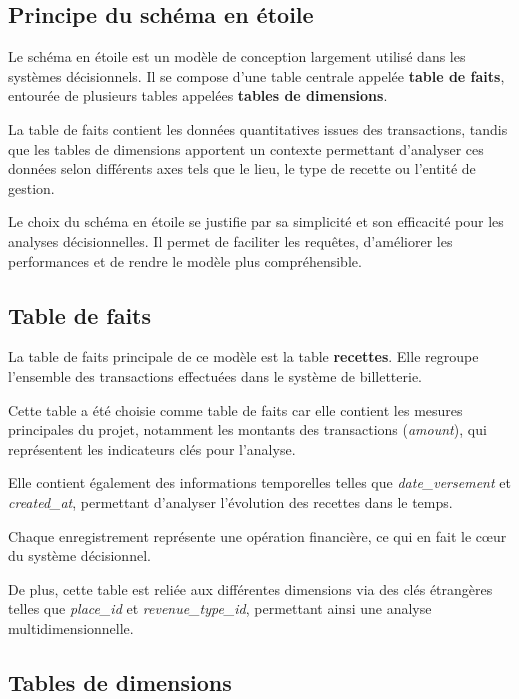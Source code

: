 \documentclass[12pt,a4paper]{report}
\begin{document}
\subsection{Principe du schéma en étoile}

Le schéma en étoile est un modèle de conception largement utilisé dans les systèmes décisionnels. Il se compose d’une table centrale appelée \textbf{table de faits}, entourée de plusieurs tables appelées \textbf{tables de dimensions}.

La table de faits contient les données quantitatives issues des transactions, tandis que les tables de dimensions apportent un contexte permettant d’analyser ces données selon différents axes tels que le lieu, le type de recette ou l’entité de gestion.

Le choix du schéma en étoile se justifie par sa simplicité et son efficacité pour les analyses décisionnelles. Il permet de faciliter les requêtes, d’améliorer les performances et de rendre le modèle plus compréhensible.


\subsection{Table de faits}

La table de faits principale de ce modèle est la table \textbf{recettes}. Elle regroupe l’ensemble des transactions effectuées dans le système de billetterie.

Cette table a été choisie comme table de faits car elle contient les mesures principales du projet, notamment les montants des transactions (\textit{amount}), qui représentent les indicateurs clés pour l’analyse.

Elle contient également des informations temporelles telles que \textit{date\_versement} et \textit{created\_at}, permettant d’analyser l’évolution des recettes dans le temps.

Chaque enregistrement représente une opération financière, ce qui en fait le cœur du système décisionnel.

De plus, cette table est reliée aux différentes dimensions via des clés étrangères telles que \textit{place\_id} et \textit{revenue\_type\_id}, permettant ainsi une analyse multidimensionnelle.


\subsection{Tables de dimensions}
\end{document}
